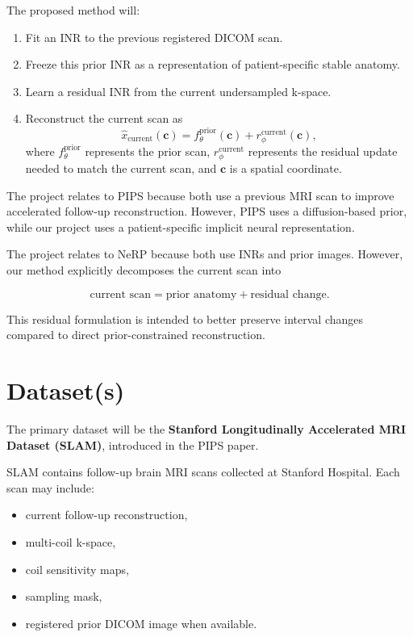 \documentclass[11pt,a4paper]{article}
\begin{document}
The proposed method will:

\begin{enumerate}
    \item Fit an INR to the previous registered DICOM scan.
    \item Freeze this prior INR as a representation of patient-specific stable anatomy.
    \item Learn a residual INR from the current undersampled k-space.
    \item Reconstruct the current scan as
    \begin{equation}
    \hat{x}_{\mathrm{current}}(\mathbf{c})
    =
    f_{\theta}^{\mathrm{prior}}(\mathbf{c})
    +
    r_{\phi}^{\mathrm{current}}(\mathbf{c}),
    \end{equation}
    where $f_{\theta}^{\mathrm{prior}}$ represents the prior scan, $r_{\phi}^{\mathrm{current}}$ represents the residual update needed to match the current scan, and $\mathbf{c}$ is a spatial coordinate.
\end{enumerate}

The project relates to PIPS because both use a previous MRI scan to improve accelerated follow-up reconstruction. However, PIPS uses a diffusion-based prior, while our project uses a patient-specific implicit neural representation.

The project relates to NeRP because both use INRs and prior images. However, our method explicitly decomposes the current scan into

\begin{equation}
\text{current scan}
=
\text{prior anatomy}
+
\text{residual change}.
\end{equation}

This residual formulation is intended to better preserve interval changes compared to direct prior-constrained reconstruction.

\section{Dataset(s)}

The primary dataset will be the \textbf{Stanford Longitudinally Accelerated MRI Dataset (SLAM)}, introduced in the PIPS paper.

SLAM contains follow-up brain MRI scans collected at Stanford Hospital. Each scan may include:

\begin{itemize}
    \item current follow-up reconstruction,
    \item multi-coil k-space,
    \item coil sensitivity maps,
    \item sampling mask,
    \item registered prior DICOM image when available.
\end{itemize}
\end{document}
